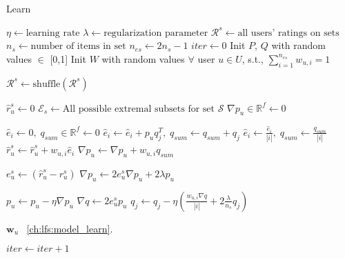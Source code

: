 \begin{algorithm}
  \caption{Learn \ES}
  \label{alg:alg-lfs-esarm}
  \begin{algorithmic}[1]
    \State $\eta \gets  \text{learning rate}$
    \State $\lambda \gets \text{regularization parameter}$
    \State $\mathcal{R}^s \gets \text{all users' ratings on sets}$  
    \State $n_s \gets \text{number of items in set}$
    \State $n_{es} \gets 2n_s - 1$ 
    \State $iter \gets 0$
    \State Init $P$, $Q$ with random values $\in$ [0,1] 
    \State Init $W$ with random values $\forall$ user $u \in U$, s.t.,
    $\sum_{i=1}^{n_{es}}w_{u,i}=1$
    
    

      \State $\mathcal{R}^s \gets \text{shuffle}(\mathcal{R}^s)$
      \State 
        
        \State $\hat{r}_{u}^s \gets 0$
        \State $\mathcal{E}_s \gets \text{All possible extremal subsets
        for set }\mathcal{S}$
        \State         
        \State $\nabla p_u \in \mathbb{R}^f \gets 0$ 
        
          \State $\hat{e}_i \gets 0,\; q_{sum} \in \mathbb{R}^f \gets 0$
            \State $\hat{e}_i \gets \hat{e}_i + p_uq_j^T, \; q_{sum} \gets q_{sum} + q_j$
          \EndFor
          \State $\hat{e}_i \gets \frac{\hat{e}_i}{|i|},\; q_{sum} \gets \frac{q_{sum}}{|i|}$
          \State $\hat{r}_{u}^s \gets \hat{r}_{u}^s + w_{u,i}\hat{e}_i$
          \State $\nabla p_u \gets \nabla p_u + w_{u,i}q_{sum}$
        \EndFor
        
        \State $e_{u}^s \gets (\hat{r}_{u}^s - r_{u}^s)$
        \State $\nabla p_u \gets 2e_{u}^s\nabla p_u +
        2\lambda p_u$ 
 
        \State $p_u \gets p_u - \eta \nabla p_u$
        \State         
        \State $\nabla q \gets 2e_u^s p_u$
          \State $q_j \gets q_j - \eta (\frac{w_{u,i}{\nabla q} }{|i|} +
            2\frac{\lambda}{n_s}q_j)$  
          \EndFor  
        \EndFor

      \EndFor
      
      \State
        \State {} $\bm{w}_u$  
        \State {}~\ref{ch:lfs:model_learn}. 
      \EndFor

      \State
      \State $iter \gets iter + 1$
    \EndWhile

    \EndProcedure
  \end{algorithmic}
\end{algorithm}


